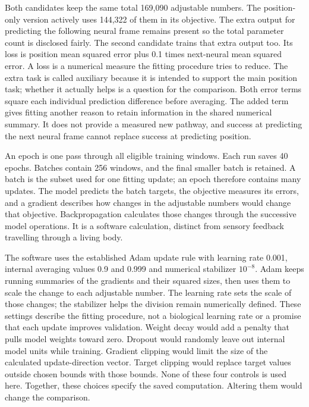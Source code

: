 Both candidates keep the same total 169,090 adjustable numbers. The position-only
version actively uses 144,322 of them in its objective. The extra output for
predicting the following neural frame remains present so the total parameter
count is disclosed fairly. The second candidate trains that extra output too.
Its loss is position mean squared error plus 0.1 times next-neural mean squared
error. A loss is a numerical measure the fitting procedure tries to reduce.
The extra task is called auxiliary because it is intended to support the main
position task; whether it actually helps is a question for the comparison.
Both error terms square each individual prediction difference before averaging.
The added term gives fitting another reason to retain information in the shared
numerical summary. It does not provide a measured new pathway, and success at
predicting the next neural frame cannot replace success at predicting position.

An epoch is one pass through all eligible training windows. Each run saves 40
epochs. Batches contain 256 windows, and the final smaller batch is retained.
A batch is the subset used for one fitting update; an epoch therefore contains
many updates. The model predicts the batch targets, the objective measures its
errors, and a gradient describes how changes in the adjustable numbers would
change that objective. Backpropagation calculates those changes through the
successive model operations. It is a software calculation, distinct from sensory
feedback travelling through a living body.

The software uses the established Adam update rule with learning rate 0.001,
internal averaging values 0.9 and 0.999 and numerical stabilizer $10^{-8}$.
Adam keeps running summaries of the gradients and their squared sizes, then
uses them to scale the change to each adjustable number. The learning rate
sets the scale of those changes; the stabilizer helps the division remain
numerically defined. These settings describe the fitting procedure, not a
biological learning rate or a promise that each update improves validation.
Weight decay would add a penalty that pulls model weights toward zero. Dropout would randomly leave out internal model units while training. Gradient clipping would limit the size of the calculated update-direction vector. Target clipping would replace target values outside chosen bounds with those bounds. None of these four controls is used here.
Together, these choices specify the saved computation. Altering them would
change the comparison.

